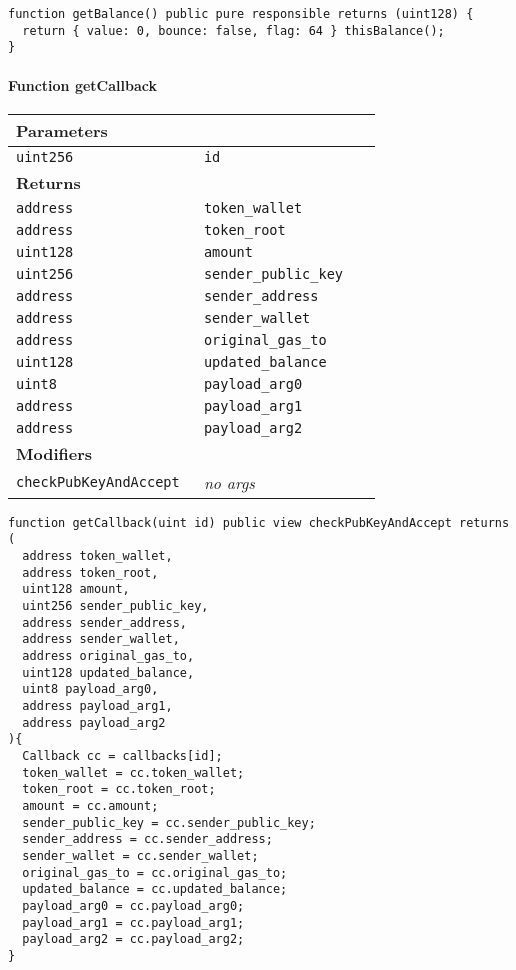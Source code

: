 \vspace{2cm}

\begin{lstlisting}[firstnumber=604]
function getBalance() public pure responsible returns (uint128) {
  return { value: 0, bounce: false, flag: 64 } thisBalance();
}
\end{lstlisting}

\paragraph{Function getCallback}


\ifsoltables
\noindent\begin{tabular}{|l|l|p{5cm}|}\hline
\multicolumn{3}{|l|}{\bf Parameters}\\\hline
\tt uint256 & \tt id &\\\hline
\multicolumn{3}{|l|}{\bf Returns}\\\hline
\tt address & \tt token\_{}wallet &\\\hline
\tt address & \tt token\_{}root &\\\hline
\tt uint128 & \tt amount &\\\hline
\tt uint256 & \tt sender\_{}public\_{}key &\\\hline
\tt address & \tt sender\_{}address &\\\hline
\tt address & \tt sender\_{}wallet &\\\hline
\tt address & \tt original\_{}gas\_{}to &\\\hline
\tt uint128 & \tt updated\_{}balance &\\\hline
\tt uint8 & \tt payload\_{}arg0 &\\\hline
\tt address & \tt payload\_{}arg1 &\\\hline
\tt address & \tt payload\_{}arg2 &\\\hline
\multicolumn{3}{|l|}{\bf Modifiers}\\\hline
\tt checkPubKeyAndAccept & {\em no args} &\\\hline
\end{tabular}
\fi

\vspace{2cm}

\begin{lstlisting}[firstnumber=571]
function getCallback(uint id) public view checkPubKeyAndAccept returns (
  address token_wallet,
  address token_root,
  uint128 amount,
  uint256 sender_public_key,
  address sender_address,
  address sender_wallet,
  address original_gas_to,
  uint128 updated_balance,
  uint8 payload_arg0,
  address payload_arg1,
  address payload_arg2
){
  Callback cc = callbacks[id];
  token_wallet = cc.token_wallet;
  token_root = cc.token_root;
  amount = cc.amount;
  sender_public_key = cc.sender_public_key;
  sender_address = cc.sender_address;
  sender_wallet = cc.sender_wallet;
  original_gas_to = cc.original_gas_to;
  updated_balance = cc.updated_balance;
  payload_arg0 = cc.payload_arg0;
  payload_arg1 = cc.payload_arg1;
  payload_arg2 = cc.payload_arg2;
}
\end{lstlisting}

